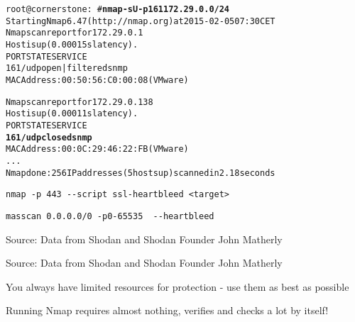 \documentclass[20pt,landscape,a4paper,footrule]{foils}
\begin{document}

\begin{alltt}\small
root@cornerstone:~#{\bfseries nmap -sU -p 161 172.29.0.0/24}
Starting Nmap 6.47 ( http://nmap.org ) at 2015-02-05 07:30 CET
Nmap scan report for 172.29.0.1
Host is up (0.00015s latency).
PORT    STATE         SERVICE
{\color{darkgreen}161/udp open|filtered snmp}
MAC Address: 00:50:56:C0:00:08 (VMware)

Nmap scan report for 172.29.0.138
Host is up (0.00011s latency).
PORT    STATE  SERVICE
{\bf{161/udp closed snmp}}
MAC Address: 00:0C:29:46:22:FB (VMware)
...
Nmap done: 256 IP addresses (5 hosts up) scanned in 2.18 seconds
\end{alltt}



\begin{list1}
\item \verb+nmap -p 443 --script ssl-heartbleed <target>+\\
\item \verb+masscan 0.0.0.0/0 -p0-65535  --heartbleed+\\
\end{list1}




Source: Data from Shodan and Shodan Founder John Matherly




Source: Data from Shodan and Shodan Founder John Matherly




\begin{list1}
\item You always have limited resources for protection - use them as best as possible
\end{list1}

Running Nmap requires almost nothing, verifies and checks a lot by itself!
\end{document}
